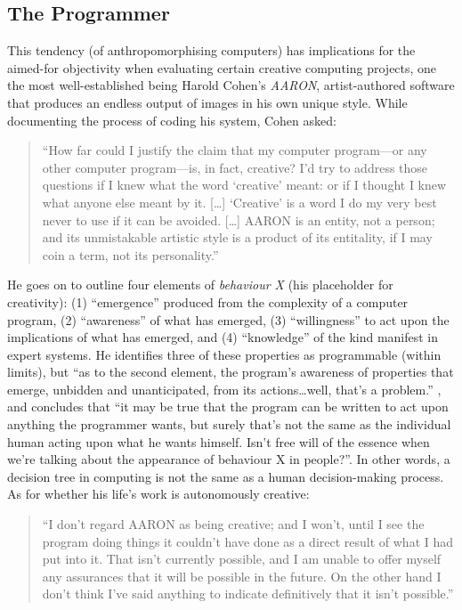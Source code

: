\subsection{The Programmer}

This tendency (of anthropomorphising computers) has implications for the aimed-for objectivity when evaluating certain creative computing projects, one the most well-established being Harold Cohen's \textit{AARON}, artist-authored software that produces an endless output of images in his own unique style. While documenting the process of coding his system, Cohen asked:

\begin{quotation}
  ``How far could I justify the claim that my computer program---or any other computer program---is, in fact, creative? I'd try to address those questions if I knew what the word `creative' meant: or if I thought I knew what anyone else meant by it. [\ldots] `Creative' is a word I do my very best never to use if it can be avoided. [\ldots] AARON is an entity, not a person; and its unmistakable artistic style is a product of its entitality, if I may coin a term, not its personality.'' 
\end{quotation}

He goes on to outline four elements of \textit{behaviour X} (his placeholder for creativity): (1) ``emergence'' produced from the complexity of a computer program, (2) ``awareness'' of what has emerged, (3) ``willingness'' to act upon the implications of what has emerged, and (4) ``knowledge'' of the kind manifest in expert systems. He identifies three of these properties as programmable (within limits), but ``as to the second element, the program's awareness of properties that emerge, unbidden and unanticipated, from its actions\ldots  well, that's a problem.'' \autocite{Cohen1999}, and concludes that ``it may be true that the program can be written to act upon anything the programmer wants, but surely that's not the same as the individual human acting upon what he wants himself. Isn't free will of the essence when we're talking about the appearance of behaviour X in people?''. In other words, a decision tree in computing is not the same as a human decision-making process. As for whether his life's work is autonomously creative:

\begin{quotation}
  ``I don't regard AARON as being creative; and I won't, until I see the program doing things it couldn't have done as a direct result of what I had put into it. That isn't currently possible, and I am unable to offer myself any assurances that it will be possible in the future. On the other hand I don't think I've said anything to indicate definitively that it isn't possible.'' 
\end{quotation}


